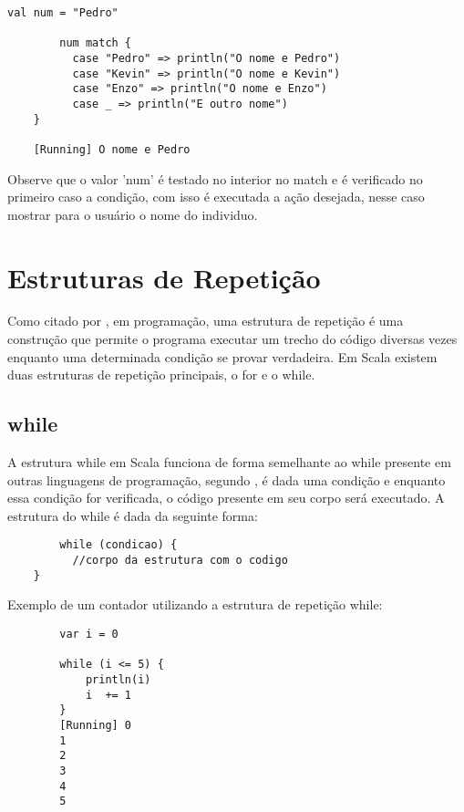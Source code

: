 	\begin{lstlisting}[breaklines]
		val num = "Pedro"
		
		num match {
		  case "Pedro" => println("O nome e Pedro")
		  case "Kevin" => println("O nome e Kevin")
		  case "Enzo" => println("O nome e Enzo")
		  case _ => println("E outro nome")
	}
	
	[Running] O nome e Pedro
	\end{lstlisting}
	 
	 Observe que o valor 'num' \'{e} testado no interior no match e \'{e} verificado no primeiro caso a condi\c{c}\~{a}o, com isso \'{e} executada a ação desejada, nesse caso mostrar para o usu\'{a}rio o nome do individuo.
	 
	 \section{Estruturas de Repeti\c{c}\~{a}o}
	 
	 Como citado por \cite{Wampler2021}, em programa\c{c}\~{a}o, uma estrutura de repeti\c{c}\~{a}o \'{e} uma constru\c{c}\~{a}o que permite o programa executar um trecho do c\'{o}digo diversas vezes enquanto uma determinada condi\c{c}\~{a}o se provar verdadeira. Em Scala existem duas estruturas de repeti\c{c}\~{a}o principais, o for e o while.
	 
	 \subsection{while}
	 
	 A estrutura while em Scala funciona de forma semelhante ao while presente em outras linguagens de programa\c{c}\~{a}o, segundo \cite{Wampler2021}, \'{e} dada uma condi\c{c}\~{a}o e enquanto essa condi\c{c}\~{a}o for verificada, o c\'{o}digo presente em seu corpo ser\'{a} executado. A estrutura do while \'{e} dada da seguinte forma:
	 
	 \begin{lstlisting}
	 	while (condicao) {
		  //corpo da estrutura com o codigo 	
 	}
	 \end{lstlisting}
 
 	Exemplo de um contador utilizando a estrutura de repeti\c{c}\~{a}o while:
 	
 	\begin{lstlisting}
 		var i = 0
 		
 		while (i <= 5) {
 			println(i)
 			i  += 1
 		}
 		[Running] 0
 		1
 		2
 		3
 		4
 		5
 	\end{lstlisting}
	 
